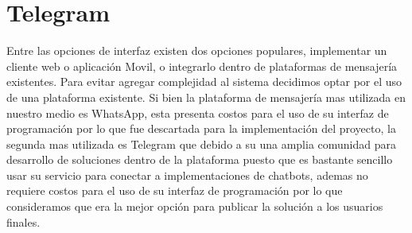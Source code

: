 \section{Telegram}
Entre las opciones de interfaz existen dos opciones populares, implementar un cliente web o
aplicación Movil, o integrarlo dentro de plataformas de mensajería existentes. Para evitar agregar
complejidad al sistema decidimos optar por el uso de una plataforma existente. Si bien la plataforma
de mensajería mas utilizada en nuestro medio es WhatsApp, esta presenta
costos para el uso de su interfaz de programación por lo que fue descartada para la implementación del
proyecto, la segunda mas utilizada es Telegram que debido a su una amplia comunidad
para desarrollo de soluciones dentro de la plataforma puesto que es bastante sencillo
usar su servicio para conectar a implementaciones de chatbots, ademas no requiere costos para el
uso de su interfaz de programación por lo que consideramos que era la mejor opción para
publicar la solución a los usuarios finales.
\cite{botfather}